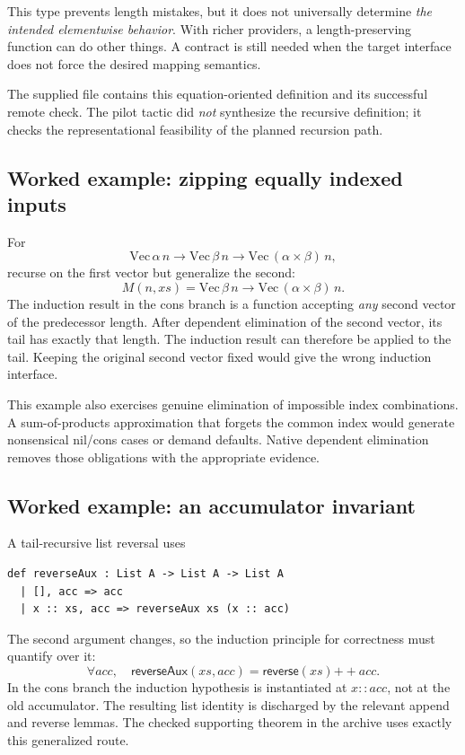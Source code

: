 \documentclass[11pt,a4paper]{article}
\theoremstyle{remark}
\begin{document}
This type prevents length mistakes, but it does not universally determine \emph{the intended elementwise behavior}. With richer providers, a length-preserving function can do other things. A contract is still needed when the target interface does not force the desired mapping semantics.

The supplied file contains this equation-oriented definition and its successful remote check. The pilot tactic did \emph{not} synthesize the recursive definition; it checks the representational feasibility of the planned recursion path.

\subsection{Worked example: zipping equally indexed inputs}

For
\[
 \mathrm{Vec}\,\alpha\,n\to\mathrm{Vec}\,\beta\,n
      \to\mathrm{Vec}\,(\alpha\times\beta)\,n,
\]
recurse on the first vector but generalize the second:
\[
 M(n,xs)=\mathrm{Vec}\,\beta\,n
               \to\mathrm{Vec}\,(\alpha\times\beta)\,n.
\]
The induction result in the cons branch is a function accepting \emph{any} second vector of the predecessor length. After dependent elimination of the second vector, its tail has exactly that length. The induction result can therefore be applied to the tail. Keeping the original second vector fixed would give the wrong induction interface.

This example also exercises genuine elimination of impossible index combinations. A sum-of-products approximation that forgets the common index would generate nonsensical nil/cons cases or demand defaults. Native dependent elimination removes those obligations with the appropriate evidence.

\subsection{Worked example: an accumulator invariant}

A tail-recursive list reversal uses
\begin{lstlisting}
def reverseAux : List A -> List A -> List A
  | [], acc => acc
  | x :: xs, acc => reverseAux xs (x :: acc)
\end{lstlisting}
The second argument changes, so the induction principle for correctness must quantify over it:
\[
 \forall acc,\quad \mathsf{reverseAux}(xs,acc)
                    =\mathsf{reverse}(xs)\mathbin{++}acc.
\]
In the cons branch the induction hypothesis is instantiated at $x::acc$, not at the old accumulator. The resulting list identity is discharged by the relevant append and reverse lemmas. The checked supporting theorem in the archive uses exactly this generalized route.
\end{document}
